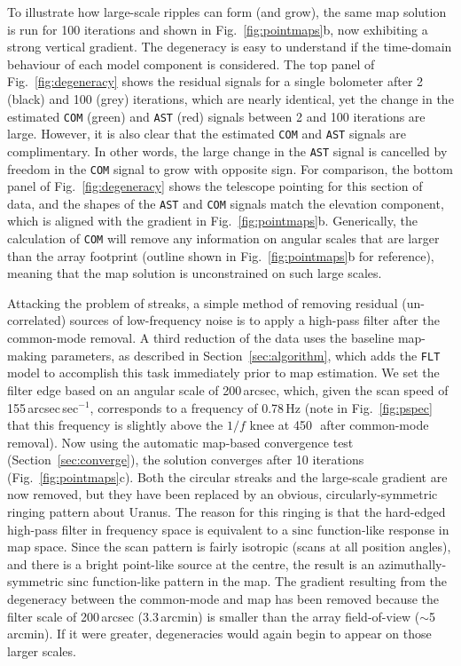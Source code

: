 \documentclass[useAMS,usenatbib,nofootinbib]{mn2e}
\def\sinc{\mathrm{sinc}}
\newcommand{\model}[1]{\texttt{#1}}
\begin{document}
To illustrate how large-scale ripples can form (and grow), the same
map solution is run for 100 iterations and shown in
Fig.~\ref{fig:pointmaps}b, now exhibiting a strong vertical
gradient. The degeneracy is easy to understand if the time-domain
behaviour of each model component is considered. The top panel of
Fig.~\ref{fig:degeneracy} shows the residual signals for a single
bolometer after 2 (black) and 100 (grey) iterations, which are nearly
identical, yet the change in the estimated \model{COM} (green) and
\model{AST} (red) signals between 2 and 100 iterations are
large. However, it is also clear that the estimated \model{COM} and
\model{AST} signals are complimentary. In other words, the large
change in the \model{AST} signal is cancelled by freedom in the
\model{COM} signal to grow with opposite sign. For comparison, the
bottom panel of Fig.~\ref{fig:degeneracy} shows the telescope pointing
for this section of data, and the shapes of the \model{AST} and
\model{COM} signals match the elevation component, which is aligned
with the gradient in Fig.~\ref{fig:pointmaps}b. Generically, the
calculation of \model{COM} will remove any information on angular
scales that are larger than the array footprint (outline shown in
Fig.~\ref{fig:pointmaps}b for reference), meaning that the map
solution is unconstrained on such large scales.

Attacking the problem of streaks, a simple method of removing residual
(un-correlated) sources of low-frequency noise is to apply a high-pass
filter after the common-mode removal. A third reduction of the data
uses the baseline map-making parameters, as described in
Section~\ref{sec:algorithm}, which adds the \model{FLT} model to
accomplish this task immediately prior to map estimation. We set the
filter edge based on an angular scale of 200\,arcsec, which, given the
scan speed of 155\,arcsec\,sec$^{-1}$, corresponds to a frequency of
0.78\,Hz (note in Fig.~\ref{fig:pspec} that this frequency is slightly
above the $1/f$ knee at 450\,\micron\ after common-mode removal). Now
using the automatic map-based convergence test
(Section~\ref{sec:converge}), the solution converges after 10
iterations (Fig.~\ref{fig:pointmaps}c). Both the circular streaks and
the large-scale gradient are now removed, but they have been replaced
by an obvious, circularly-symmetric ringing pattern about Uranus. The
reason for this ringing is that the hard-edged high-pass filter in
frequency space is equivalent to a $\sinc$ function-like response in
map space. Since the scan pattern is fairly isotropic (scans at all
position angles), and there is a bright point-like source at the
centre, the result is an azimuthally-symmetric $\sinc$ function-like
pattern in the map. The gradient resulting from the degeneracy between
the common-mode and map has been removed because the filter scale of
200\,arcsec (3.3\,arcmin) is smaller than the array field-of-view
($\sim$5\,arcmin). If it were greater, degeneracies would again begin
to appear on those larger scales.
\end{document}

